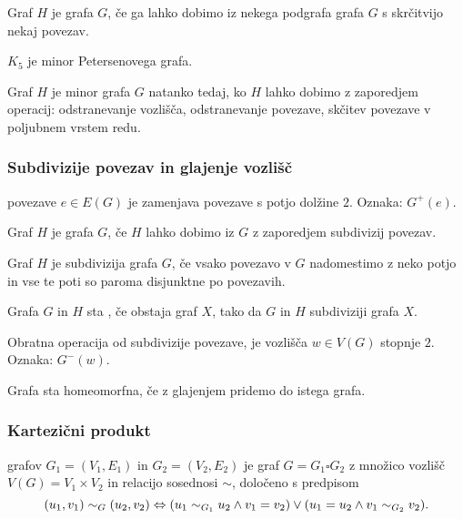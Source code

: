 \begin{definicija}
    Graf $H$ je  grafa $G$, če ga lahko dobimo iz nekega podgrafa grafa $G$ s skrčitvijo nekaj povezav.
\end{definicija}

\begin{primer}
    $K_5$ je minor Petersenovega grafa.
\end{primer}

\begin{opomba}
    Graf $H$ je minor grafa $G$ natanko tedaj, ko $H$ lahko dobimo z zaporedjem operacij: odstranevanje vozlišča, odstranevanje povezave, skčitev povezave v poljubnem vrstem redu.
\end{opomba}

\newpage
\subsubsection*{Subdivizije povezav in glajenje vozlišč}
\begin{definicija}
     povezave $e \in E(G)$ je zamenjava povezave s potjo dolžine $2$. Oznaka: $G^+(e)$.
\end{definicija}
\begin{definicija}
    Graf $H$ je  grafa $G$, če $H$ lahko dobimo iz $G$ z zaporedjem subdivizij povezav.
\end{definicija}
\begin{opomba}
    Graf $H$ je subdivizija grafa $G$, če vsako povezavo v $G$ nadomestimo z neko potjo in vse te poti so paroma disjunktne po povezavih.
\end{opomba}
\begin{definicija}
    Grafa $G$ in $H$ sta , če obstaja graf $X$, tako da $G$ in $H$ subdiviziji grafa $X$.
\end{definicija}

\begin{definicija}
    Obratna operacija od subdivizije povezave, je  vozlišča $w \in V(G)$ stopnje $2$. Oznaka: $G^-(w)$.
\end{definicija}

\begin{opomba}
    Grafa sta homeomorfna, če z glajenjem pridemo do istega grafa.
\end{opomba}

\subsubsection*{Kartezični produkt}
\begin{definicija}
     grafov $G_1 = (V_1, E_1)$ in $G_2 = (V_2, E_2)$ je graf $G = G_1 \square G_2$ z množico vozlišč $V(G) = V_1 \times V_2$ in relacijo sosednosi $\sim$, določeno s predpisom
    $$(u_1, v_1) \sim_G (u_2, v_2) \Leftrightarrow (u_1 \sim_{G_1} u_2 \land v_1 = v_2) \lor (u_1 = u_2 \land v_1 \sim_{G_2} v_2).$$
\end{definicija}

